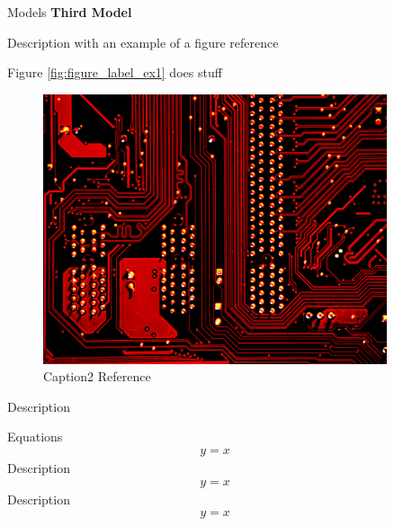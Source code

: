 \documentclass[final]{beamer}
\newlength{\sepwid}
\newlength{\onecolwid}
\newlength{\threecolwid}
\begin{document}
\begin{frame}[t]
\begin{columns}[t,totalwidth=\threecolwid]
\begin{column}{\onecolwid}
\begin{block}{Models}
\vspace{0.7em}
\textbf{Third Model}

Description with an example of a figure reference

Figure \ref{fig:figure_label_ex1} does stuff 

\begin{figure}
	\label{fig:figure_label_ex2}
	\includegraphics[width=1\linewidth]{graphic_name2}
	\caption{Caption2 Reference \cite{call_tag_article}}
\end{figure}

Description 

Equations
\begin{align*}
	y = x
\end{align*}
Description
\begin{align*}
	y = x
\end{align*}
Description
\begin{align*}
	y = x
\end{align*}

\end{block}



\end{column} %

\begin{column}{\sepwid}\end{column} %

\begin{column}{\onecolwid} %


\end{column}
\end{columns}
\end{frame}
\end{document}
